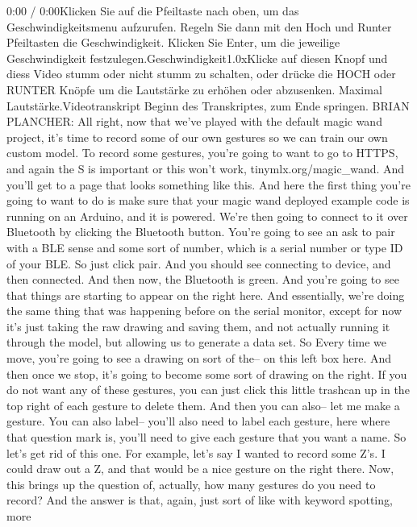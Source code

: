     0:00 / 0:00Klicken Sie auf die Pfeiltaste nach oben, um das Geschwindigkeitsmenu aufzurufen. Regeln Sie dann mit den Hoch und Runter Pfeiltasten die Geschwindigkeit. Klicken Sie Enter, um die jeweilige Geschwindigkeit festzulegen.Geschwindigkeit1.0xKlicke auf diesen Knopf und diess Video stumm oder nicht stumm zu schalten, oder drücke die HOCH oder RUNTER Knöpfe um die Lautstärke zu erhöhen oder abzusenken. Maximal Lautstärke.Videotranskript
    Beginn des Transkriptes, zum Ende springen.
    BRIAN PLANCHER: All right, now that we've
    played with the default magic wand project, it's time
    to record some of our own gestures so we can train our own custom model.
    To record some gestures, you're going to want to go to HTTPS,
    and again the S is important or this won't work, tinymlx.org/magic\_wand.
    And you'll get to a page that looks something like this.
    And here the first thing you're going to want to do
    is make sure that your magic wand deployed example code is running
    on an Arduino, and it is powered.
    We're then going to connect to it over Bluetooth
    by clicking the Bluetooth button.
    You're going to see an ask to pair with a BLE
    sense and some sort of number, which is a serial number or type ID of your BLE.
    So just click pair.
    And you should see connecting to device, and then connected.
    And then now, the Bluetooth is green.
    And you're going to see that things are starting to appear on the right here.
    And essentially, we're doing the same thing that was happening before
    on the serial monitor, except for now it's just taking the raw drawing
    and saving them, and not actually running it through the model,
    but allowing us to generate a data set.
    So Every time we move, you're going to see a drawing
    on sort of the-- on this left box here.
    And then once we stop, it's going to become
    some sort of drawing on the right.
    If you do not want any of these gestures,
    you can just click this little trashcan up
    in the top right of each gesture to delete them.
    And then you can also--
    let me make a gesture.
    You can also label-- you'll also need to label each gesture,
    here where that question mark is, you'll need
    to give each gesture that you want a name.
    So let's get rid of this one.
    For example, let's say I wanted to record some Z's.
    I could draw out a Z, and that would be a nice gesture on the right there.
    Now, this brings up the question of, actually,
    how many gestures do you need to record?
    And the answer is that, again, just sort of like with keyword spotting, more
